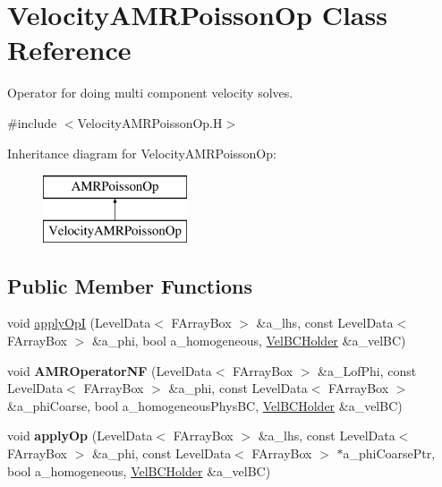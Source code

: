 \hypertarget{class_velocity_a_m_r_poisson_op}{\section{Velocity\-A\-M\-R\-Poisson\-Op Class Reference}
\label{class_velocity_a_m_r_poisson_op}
}


Operator for doing multi component velocity solves.  




{\ttfamily \#include $<$Velocity\-A\-M\-R\-Poisson\-Op.\-H$>$}

Inheritance diagram for Velocity\-A\-M\-R\-Poisson\-Op\-:\begin{figure}[H]
\begin{center}
\leavevmode
\includegraphics[height=2.000000cm]{class_velocity_a_m_r_poisson_op}
\end{center}
\end{figure}
\subsection*{Public Member Functions}
\begin{DoxyCompactItemize}
\item 
void \hyperlink{class_velocity_a_m_r_poisson_op_a6b60f7199140c6c9f8d4a35764c4bfe8}{apply\-Op\-I} (Level\-Data$<$ F\-Array\-Box $>$ \&a\-\_\-lhs, const Level\-Data$<$ F\-Array\-Box $>$ \&a\-\_\-phi, bool a\-\_\-homogeneous, \hyperlink{class_vel_b_c_holder}{Vel\-B\-C\-Holder} \&a\-\_\-vel\-B\-C)
\item 
\hypertarget{class_velocity_a_m_r_poisson_op_adb0f5075c12ac349f9e6ad5f879afb1d}{void {\bfseries A\-M\-R\-Operator\-N\-F} (Level\-Data$<$ F\-Array\-Box $>$ \&a\-\_\-\-Lof\-Phi, const Level\-Data$<$ F\-Array\-Box $>$ \&a\-\_\-phi, const Level\-Data$<$ F\-Array\-Box $>$ \&a\-\_\-phi\-Coarse, bool a\-\_\-homogeneous\-Phys\-B\-C, \hyperlink{class_vel_b_c_holder}{Vel\-B\-C\-Holder} \&a\-\_\-vel\-B\-C)}\label{class_velocity_a_m_r_poisson_op_adb0f5075c12ac349f9e6ad5f879afb1d}

\item 
\hypertarget{class_velocity_a_m_r_poisson_op_a0ca6006dfe38fc4b42145d66fd32b680}{void {\bfseries apply\-Op} (Level\-Data$<$ F\-Array\-Box $>$ \&a\-\_\-lhs, const Level\-Data$<$ F\-Array\-Box $>$ \&a\-\_\-phi, const Level\-Data$<$ F\-Array\-Box $>$ $\ast$a\-\_\-phi\-Coarse\-Ptr, bool a\-\_\-homogeneous, \hyperlink{class_vel_b_c_holder}{Vel\-B\-C\-Holder} \&a\-\_\-vel\-B\-C)}\label{class_velocity_a_m_r_poisson_op_a0ca6006dfe38fc4b42145d66fd32b680}

\end{DoxyCompactItemize}


